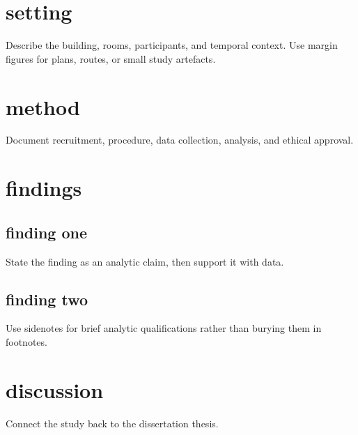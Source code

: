 \section{setting}
Describe the building, rooms, participants, and temporal context. Use margin figures for plans, routes, or small study artefacts.

\begin{marginfigure}
\end{marginfigure}

\section{method}
Document recruitment, procedure, data collection, analysis, and ethical approval.

\section{findings}
\subsection{finding one}
State the finding as an analytic claim, then support it with data.

\subsection{finding two}
Use sidenotes for brief analytic qualifications rather than burying them in footnotes.

\section{discussion}
Connect the study back to the dissertation thesis.
